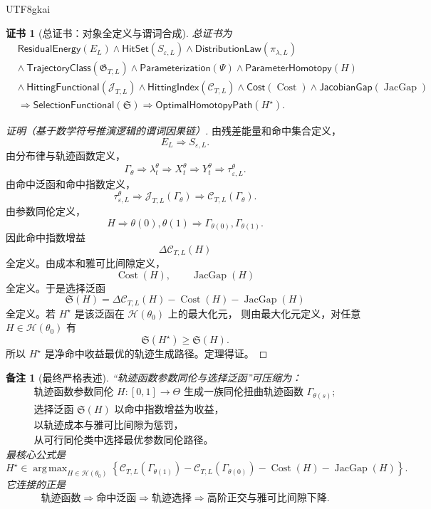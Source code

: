 \documentclass[12pt]{article}
\newtheorem{remark}{备注}[section]
\newtheorem{Certificate}{证书}[section]
\DeclareMathOperator{\Cost}{Cost}
\DeclareMathOperator{\JacGap}{JacGap}
\DeclareMathOperator*{\argmax}{arg\,max}
\begin{document}
\begin{CJK*}{UTF8}{gkai}
\begin{Certificate}[总证书：对象全定义与谓词合成]
\label{cert:tex57-total-closure}
总证书为
\[
\begin{aligned}
&\mathsf{ResidualEnergy}(E_L)
\wedge
\mathsf{HitSet}(S_{\varepsilon,L})
\wedge
\mathsf{DistributionLaw}(\pi_{\lambda,L})\\
&\wedge\
\mathsf{TrajectoryClass}(\mathfrak G_{T,L})
\wedge
\mathsf{Parameterization}(\Psi)
\wedge
\mathsf{ParameterHomotopy}(H)\\
&\wedge\
\mathsf{HittingFunctional}(\mathcal J_{T,L})
\wedge
\mathsf{HittingIndex}(\mathcal C_{T,L})
\wedge
\mathsf{Cost}(\Cost)
\wedge
\mathsf{JacobianGap}(\JacGap)\\
&\Longrightarrow
\mathsf{SelectionFunctional}(\mathfrak S)
\Longrightarrow
\mathsf{OptimalHomotopyPath}(H^\star).
\end{aligned}
\]
\end{Certificate}

\begin{proof}[证明（基于数学符号推演逻辑的谓词因果链）]
由残差能量和命中集合定义，
\[
  E_L
  \Longrightarrow
  S_{\varepsilon,L}.
\]
由分布律与轨迹函数定义，
\[
  \Gamma_\theta
  \Longrightarrow
  \lambda_t^\theta
  \Longrightarrow
  X_t^\theta
  \Longrightarrow
  Y_t^\theta
  \Longrightarrow
  \tau_{\varepsilon,L}^{\theta}.
\]
由命中泛函和命中指数定义，
\[
  \tau_{\varepsilon,L}^{\theta}
  \Longrightarrow
  \mathcal J_{T,L}(\Gamma_\theta)
  \Longrightarrow
  \mathcal C_{T,L}(\Gamma_\theta).
\]
由参数同伦定义，
\[
  H
  \Longrightarrow
  \theta(0),\theta(1)
  \Longrightarrow
  \Gamma_{\theta(0)},\Gamma_{\theta(1)}.
\]
因此命中指数增益
\[
  \Delta\mathcal C_{T,L}(H)
\]
全定义。由成本和雅可比间隙定义，
\[
  \Cost(H),
  \qquad
  \JacGap(H)
\]
全定义。于是选择泛函
\[
  \mathfrak S(H)
  =
  \Delta\mathcal C_{T,L}(H)
  -
  \Cost(H)
  -
  \JacGap(H)
\]
全定义。若 \(H^\star\) 是该泛函在 \(\mathcal H(\theta_0)\) 上的最大化元，
则由最大化元定义，对任意 \(H\in\mathcal H(\theta_0)\) 有
\[
  \mathfrak S(H^\star)\ge\mathfrak S(H).
\]
所以 \(H^\star\) 是净命中收益最优的轨迹生成路径。定理得证。
\end{proof}

\begin{remark}[最终严格表述]
“轨迹函数参数同伦与选择泛函”可压缩为：
\[
\boxed{
\begin{gathered}
\text{轨迹函数参数同伦 }H:[0,1]\to\Theta
\text{ 生成一族同伦扭曲轨迹函数 }
\Gamma_{\theta(s)};\\
\text{选择泛函 }\mathfrak S(H)
\text{ 以命中指数增益为收益，}\\
\text{以轨迹成本与雅可比间隙为惩罚，}\\
\text{从可行同伦类中选择最优参数同伦路径。}
\end{gathered}
}
\]
最核心公式是
\[
\boxed{
H^\star
\in
\argmax_{H\in\mathcal H(\theta_0)}
\left\{
\mathcal C_{T,L}(\Gamma_{\theta(1)})
-
\mathcal C_{T,L}(\Gamma_{\theta(0)})
-
\Cost(H)
-
\JacGap(H)
\right\}.
}
\]
它连接的正是
\[
\boxed{
\text{轨迹函数}
\Longrightarrow
\text{命中泛函}
\Longrightarrow
\text{轨迹选择}
\Longrightarrow
\text{高阶正交与雅可比间隙下降}.
}
\]
\end{remark}


\end{CJK*}
\end{document}
